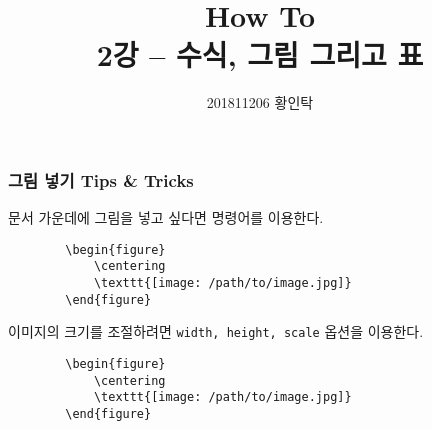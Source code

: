 \documentclass[aspectratio={169}]{beamer}
\title{How To \latex{} \\ \normalsize \textnormal{2강 -- 수식, 그림 그리고 표}}
\author{201811206 황인탁}
\begin{document}
\maketitle


\begin{frame}[fragile]
    \frametitle{그림 넣기 Tips \& Tricks}

    문서 가운데에 그림을 넣고 싶다면 \texttt{\centering} 명령어를 이용한다.
    \begin{verbatim}
        \begin{figure}
            \centering
            \texttt{[image: /path/to/image.jpg]}
        \end{figure}
    \end{verbatim}

    이미지의 크기를 조절하려면 \texttt{width, height, scale} 옵션을 이용한다.
    \begin{verbatim}
        \begin{figure}
            \centering
            \texttt{[image: /path/to/image.jpg]}
        \end{figure}
    \end{verbatim}

\end{frame}
\end{document}

